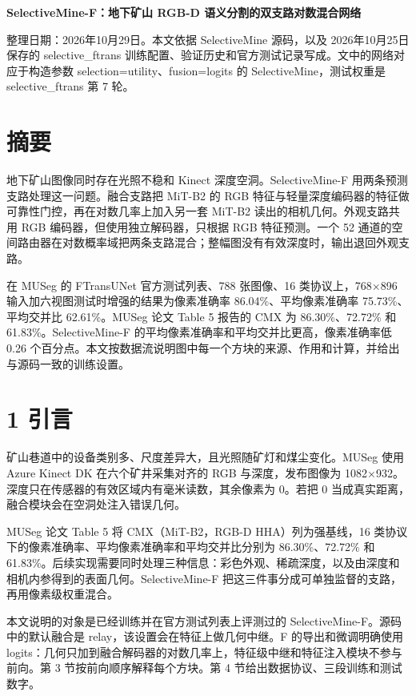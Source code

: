 \documentclass[UTF8,a4paper,11pt]{ctexart}
\begin{document}
\begin{center}{\bfseries SelectiveMine-F：地下矿山 RGB-D 语义分割的双支路对数混合网络}\end{center}
整理日期：2026年10月29日。本文依据 SelectiveMine 源码，以及 2026年10月25日保存的 selective\_ftrans 训练配置、验证历史和官方测试记录写成。文中的网络对应于构造参数 selection=utility、fusion=logits 的 SelectiveMine，测试权重是 selective\_ftrans 第 7 轮。

\section*{摘要}
地下矿山图像同时存在光照不稳和 Kinect 深度空洞。SelectiveMine-F 用两条预测支路处理这一问题。融合支路把 MiT-B2 的 RGB 特征与轻量深度编码器的特征做可靠性门控，再在对数几率上加入另一套 MiT-B2 读出的相机几何。外观支路共用 RGB 编码器，但使用独立解码器，只根据 RGB 特征预测。一个 52 通道的空间路由器在对数概率域把两条支路混合；整幅图没有有效深度时，输出退回外观支路。

在 MUSeg 的 FTransUNet 官方测试列表、788 张图像、16 类协议上，768×896 输入加六视图测试时增强的结果为像素准确率 86.04\%、平均像素准确率 75.73\%、平均交并比 62.61\%。MUSeg 论文 Table 5 报告的 CMX 为 86.30\%、72.72\% 和 61.83\%。SelectiveMine-F 的平均像素准确率和平均交并比更高，像素准确率低 0.26 个百分点。本文按数据流说明图中每一个方块的来源、作用和计算，并给出与源码一致的训练设置。

\section*{1 引言}
矿山巷道中的设备类别多、尺度差异大，且光照随矿灯和煤尘变化。MUSeg 使用 Azure Kinect DK 在六个矿井采集对齐的 RGB 与深度，发布图像为 1082×932。深度只在传感器的有效区域内有毫米读数，其余像素为 0。若把 0 当成真实距离，融合模块会在空洞处注入错误几何。

MUSeg 论文 Table 5 将 CMX（MiT-B2，RGB-D HHA）列为强基线，16 类协议下的像素准确率、平均像素准确率和平均交并比分别为 86.30\%、72.72\% 和 61.83\%。后续实现需要同时处理三种信息：彩色外观、稀疏深度，以及由深度和相机内参得到的表面几何。SelectiveMine-F 把这三件事分成可单独监督的支路，再用像素级权重混合。

本文说明的对象是已经训练并在官方测试列表上评测过的 SelectiveMine-F。源码中的默认融合是 relay，该设置会在特征上做几何中继。F 的导出和微调明确使用 logits：几何只加到融合解码器的对数几率上，特征级中继和特征注入模块不参与前向。第 3 节按前向顺序解释每个方块。第 4 节给出数据协议、三段训练和测试数字。
\end{document}
